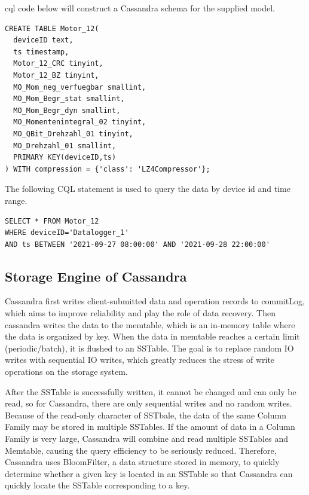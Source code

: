 \ac{cql} code below will construct a Cassandra schema for the supplied model.

\begin{verbatim}
CREATE TABLE Motor_12(
  deviceID text,
  ts timestamp,
  Motor_12_CRC tinyint,
  Motor_12_BZ tinyint,
  MO_Mom_neg_verfuegbar smallint,
  MO_Mom_Begr_stat smallint,
  MO_Mom_Begr_dyn smallint,
  MO_Momentenintegral_02 tinyint,
  MO_QBit_Drehzahl_01 tinyint,
  MO_Drehzahl_01 smallint,
  PRIMARY KEY(deviceID,ts)
) WITH compression = {'class': 'LZ4Compressor'};
\end{verbatim}

The following CQL statement is used to query the data by device id and time range.

\begin{verbatim}
SELECT * FROM Motor_12 
WHERE deviceID='Datalogger_1' 
AND ts BETWEEN '2021-09-27 08:00:00' AND '2021-09-28 22:00:00'
\end{verbatim}

\subsection{Storage Engine of Cassandra}
Cassandra first writes client-submitted data and operation records to commitLog, which aims to improve reliability and play the role of data recovery. Then cassandra writes the data to the memtable, which is an in-memory table where the data is organized by key. When the data in memtable reaches a certain limit (periodic/batch), it is flushed to an SSTable. The goal is to replace random IO writes with sequential IO writes, which greatly reduces the stress of write operations on the storage system. 

After the SSTable is successfully written, it cannot be changed and can only be read, so for Cassandra, there are only sequential writes and no random writes. Because of the read-only character of SSTbale, the data of the same Column Family may be stored in multiple SSTables. If the amount of data in a Column Family is very large, Cassandra will combine and read multiple SSTables and Memtable, causing the query efficiency to be seriously reduced\cite{cassandra_write}. Therefore, Cassandra uses BloomFilter, a data structure stored in memory, to quickly determine whether a given key is located in an SSTable so that Cassandra can quickly locate the SSTable corresponding to a key.

